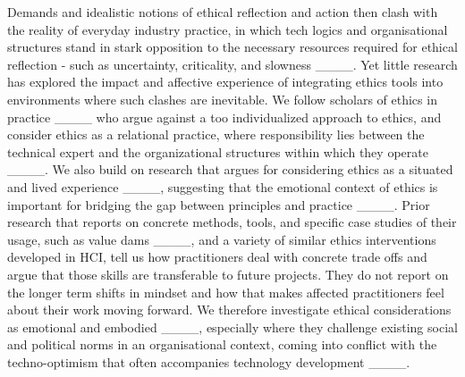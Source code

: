 Demands and idealistic notions of ethical reflection and action then clash with the reality of everyday industry practice, in which tech logics and organisational structures stand in stark opposition to the necessary resources required for ethical reflection - such as uncertainty, criticality, and slowness ____. Yet little research has explored the impact and affective experience of integrating ethics tools into environments where such clashes are inevitable. We follow scholars of ethics in practice ____ who argue against a too individualized approach to ethics, and consider ethics as a relational practice, where responsibility lies between the technical expert and the organizational structures within which they operate ____. We also build on research that argues for considering ethics as a situated and lived experience ____, suggesting that the emotional context of ethics is important for bridging the gap between principles and practice ____. Prior research that reports on concrete methods, tools, and specific case studies of their usage, such as value dams ____, and a variety of similar ethics interventions developed in HCI, tell us how practitioners deal with concrete trade offs and argue that those skills are transferable to future projects. They do not report on the longer term shifts in mindset and how that makes affected practitioners feel about their work moving forward. We therefore investigate ethical considerations as emotional and embodied ____, especially where they challenge existing social and political norms in an organisational context, coming into conflict with the techno-optimism that often accompanies technology development ____.


